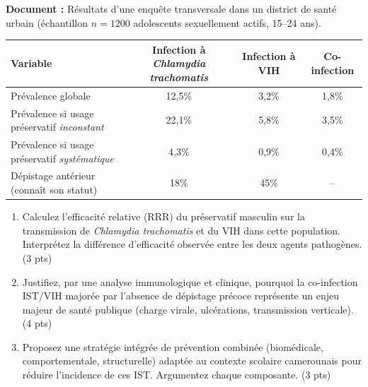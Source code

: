 \documentclass[11pt]{article}
\begin{document}
\begin{exercice}
\textbf{Document :} Résultats d'une enquête transversale dans un district de santé urbain (échantillon $n=1200$ adolescents sexuellement actifs, 15--24 ans).

\begin{tabular}{|l|c|c|c|}
\hline
\textbf{Variable} & \textbf{Infection à \textit{Chlamydia trachomatis}} & \textbf{Infection à VIH} & \textbf{Co-infection} \\
\hline
Prévalence globale & 12,5\% & 3,2\% & 1,8\% \\
\hline
Prévalence si usage préservatif \textit{inconstant} & 22,1\% & 5,8\% & 3,5\% \\
\hline
Prévalence si usage préservatif \textit{systématique} & 4,3\% & 0,9\% & 0,4\% \\
\hline
Dépistage antérieur (connaît son statut) & 18\% & 45\% & -- \\
\hline
\end{tabular}

\begin{enumerate}
    \item Calculez l'efficacité relative (RRR) du préservatif masculin sur la transmission de \textit{Chlamydia trachomatis} et du VIH dans cette population. Interprétez la différence d'efficacité observée entre les deux agents pathogènes. (3 pts)
    \item Justifiez, par une analyse immunologique et clinique, pourquoi la co-infection IST/VIH majorée par l'absence de dépistage précoce représente un enjeu majeur de santé publique (charge virale, ulcérations, transmission verticale). (4 pts)
    \item Proposez une stratégie intégrée de prévention combinée (biomédicale, comportementale, structurelle) adaptée au contexte scolaire camerounais pour réduire l'incidence de ces IST. Argumentez chaque composante. (3 pts)
\end{enumerate}
\end{exercice}
\end{document}
